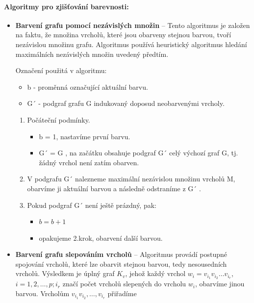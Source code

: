 \paragraph*{Algoritmy pro zjišťování barevnosti:}
\begin{itemize}
    \item \textbf{Barvení grafu pomocí nezávislých množin} --
    Tento algoritmus je založen na faktu, že množina vrcholů, 
    které jsou obarveny stejnou barvou, tvoří nezávislou 
    množinu grafu. Algoritmus používá heuristický algoritmus 
    hledání maximálních nezávislých množin uvedený předtím.

    Označení použitá v algoritmu:
    \begin{itemize}
        \item b - proměnná označující aktuální barvu.
        \item G´ - podgraf grafu G indukovaný doposud neobarvenými vrcholy.
    \end{itemize}
    \begin{enumerate}
        \item Počáteční podmínky.
        \begin{itemize}
            \item[a.] b = 1, nastavíme první barvu.
            \item[b.] G´ = G , na začátku obsahuje podgraf G´ celý výchozí graf G, tj. žádný vrchol není zatím obarven. 
        \end{itemize}
        \item V podgrafu G´ nalezneme maximální nezávislou množinu vrcholů M, obarvíme ji aktuální barvou a následně odstraníme z G´ .
        \item Pokud podgraf G´ není ještě prázdný, pak:
        \begin{itemize}
            \item[a.] $b = b + 1$
            \item[b.] opakujeme 2.krok, obarvení další barvou.
        \end{itemize}
    \end{enumerate}
    \item \textbf{Barvení grafu slepováním vrcholů} --
    Algoritmus provádí postupné spojování vrcholů, které lze 
    obarvit stejnou barvou, tedy nesousedních vrcholů. 
    Výsledkem je úplný graf $K_v$, jehož každý vrchol 
    $w_i=v_{i_1}v_{i_2}\dots v_{i_r}$,
    $i = 1, 2,\dots, p; i_r$ značí počet vrcholů slepených do vrcholu 
    $w_i$, obarvíme jinou barvou. Vrcholům $v_{i_1}v_{i_2},\dots,v_{i_r}$ přiřadíme 

\end{itemize}
